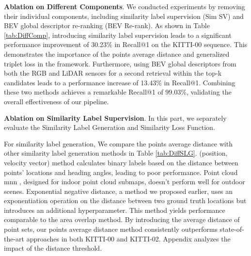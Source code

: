 \textbf{Ablation on Different Components}. We conducted experiments by removing their individual components, including similarity label supervision (Sim SV) and BEV global descriptor re-ranking (BEV Re-rank). As shown in Table \ref{tab:DiffComp}, introducing similarity label supervision leads to a significant performance improvement of 30.23\% in Recall@1 on the KITTI-00 sequence. This demonstrates the importance of the points average distance and generalized triplet loss in the framework. Furthermore, using BEV global descriptors from both the RGB and LiDAR sensors for a second retrieval within the top-k candidates leads to a performance increase of 13.43\% in Recall@1. Combining these two methods achieves a remarkable Recall@1 of 99.03\%, validating the overall effectiveness of our pipeline.

\textbf{Ablation on Similarity Label Supervision}. 
In this part, we separately evaluate the Similarity Label Generation and Similarity Loss Function.

For similarity label generation, We compare the points average distance with other similarity label generation methods in Table \ref{tab:DiffSLG}. (position, velocity vector) \cite{ge2024bev2pr} method calculates binary labels based on the distance between points' locations and heading angles, leading to poor performance. Point cloud mnn \cite{leyva2023data}, designed for indoor point cloud submaps, doesn't perform well for outdoor scenes. Exponential negative distance, a method we proposed earlier, uses an exponentiation operation on the distance between two ground truth locations but introduces an additional hyperparameter. This method yields performance comparable to the area overlap \cite{leyva2023data} method. By introducing the average distance of point sets, our points average distance method consistently outperforms state-of-the-art approaches in both KITTI-00 and KITTI-02. Appendix analyzes the impact of the distance threshold.

\begin{table}[!t]
    \centering
    \caption{ABLATION STUDIES ON DIFFERENT SIMILARITY LABEL GENERATION METHODS}
    \label{tab:DiffSLG}
    \resizebox{8.5cm}{!}{
    \begin{tabular}{c|c|c}
    \hline
        & KITTI-00 & KITTI-02 \\ \hline
        Method & R@1 / R@5 / R@1\% & R@1 / R@5 / R@1\% \\ \hline
        (Position, Velocity Vector) \cite{ge2024bev2pr} & 77.45 / 86.17 / 96.32 & 61.94 / 73.12 / 87.99 \\
        Area Overlap \cite{leyva2023data} & 98.26 / 99.80 / 100.0 & 94.23 / 97.55 / 99.55 \\
        Point Cloud NN \cite{leyva2023data} & 95.75 / 98.57 / 99.91 & 86.35 / 91.44 / 95.67 \\
        Exponential Negative Distance & 98.00 / 99.87 / 100.0 & 94.66 / 98.41 / 99.49 \\
        Points Average Distance & 99.03 / 99.91 / 100.0 & 95.07 / 98.22 / 99.66 \\ \hline
    \end{tabular}
    }
\end{table}

